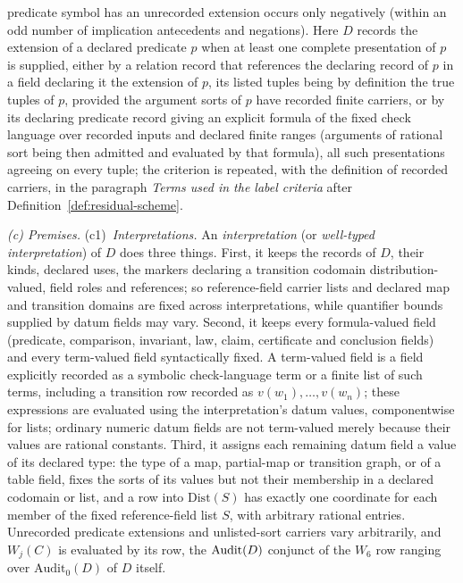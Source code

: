 \begin{definition}
predicate symbol has an unrecorded extension occurs only negatively (within an
odd number of implication antecedents and negations). Here \(D\) records the extension of a declared predicate \(p\) when at least
one complete presentation of \(p\) is supplied, either by a relation record
that references the declaring record of \(p\) in a field declaring it the
extension of \(p\), its listed tuples being by definition the true tuples of
\(p\), provided the argument sorts of \(p\) have recorded finite carriers, or
by its declaring predicate record giving an explicit formula of the fixed check
language over recorded inputs and declared finite ranges (arguments of
rational sort being then admitted and evaluated by that formula), all such presentations agreeing on
every tuple; the criterion is repeated, with the definition of recorded
carriers, in the paragraph \emph{Terms used in the label criteria} after
Definition~\ref{def:residual-scheme}.
\par\emph{(c) Premises.} (c1)~\emph{Interpretations.} An \emph{interpretation} (or \emph{well-typed interpretation}) of \(D\) does three things. First, it keeps the records of \(D\), their kinds, declared uses, the markers declaring a transition codomain distribution-valued, field roles and references; so reference-field carrier lists and declared map and transition domains are fixed across interpretations, while quantifier bounds supplied by datum fields may vary. Second, it keeps every formula-valued field (predicate, comparison, invariant, law, claim, certificate and conclusion fields) and every term-valued field syntactically fixed. A term-valued field is a field explicitly recorded as a symbolic check-language term or a finite list of such terms, including a transition row recorded as \(v(w_1),\dots,v(w_n)\); these expressions are evaluated using the interpretation's datum values, componentwise for lists; ordinary numeric datum fields are not term-valued merely because their values are rational constants. Third, it assigns each remaining datum field a value of its declared type: the type of a map, partial-map or transition graph, or of a table field, fixes the sorts of its values but not their membership in a declared codomain or list, and a row into \(\mathrm{Dist}(S)\) has exactly one coordinate for each member of the fixed reference-field list \(S\), with arbitrary rational entries. Unrecorded predicate extensions and unlisted-sort carriers vary arbitrarily, and \(W_j(C)\) is evaluated by its row, the \(\operatorname{Audit}\!\left(D\right)\) conjunct of the \(W_6\) row ranging over \(\mathrm{Audit}_0(D)\) of \(D\) itself.

\end{definition}
